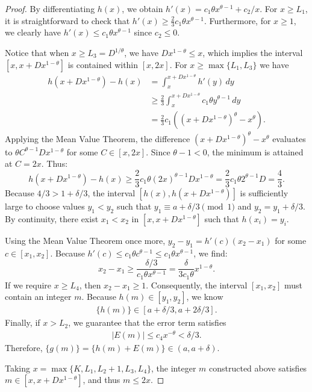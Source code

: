 \documentclass[12pt]{amsart}
\numberwithin{equation}{section}
\begin{document}
\begin{proof}
By differentiating $h(x)$, we obtain $h'(x) = c_{1}\theta x^{\theta-1} + c_{2}/x$. For $x \geq L_{1}$, it is straightforward to check that $h'(x) \geq \frac{2}{3}c_{1}\theta x^{\theta-1}$. Furthermore, for $x \geq 1$, we clearly have $h'(x) \leq c_{1}\theta x^{\theta-1}$ since $c_2 \leq 0$. 

Notice that when $x \geq L_{3} = D^{1/\theta}$, we have $Dx^{1-\theta} \leq x$, which implies the interval $[x, x+Dx^{1-\theta}]$ is contained within $[x, 2x]$. For $x \geq \max\{L_1, L_3\}$ we have
\begin{align*}
h(x+Dx^{1-\theta}) - h(x) &= \int_{x}^{x+Dx^{1-\theta}} h'(y) \, dy \\
&\geq \frac{2}{3} \int_x^{x+Dx^{1-\theta}} c_1 \theta y^{\theta-1} \, dy \\
&= \frac{2}{3} c_1 \left( (x+Dx^{1-\theta})^\theta - x^\theta \right).
\end{align*}
Applying the Mean Value Theorem, the difference $(x+Dx^{1-\theta})^\theta - x^\theta$ evaluates to $\theta C^{\theta-1} Dx^{1-\theta}$ for some $C \in [x, 2x]$. Since $\theta - 1 < 0$, the minimum is attained at $C = 2x$. Thus:
\begin{equation*}
h(x+Dx^{1-\theta}) - h(x) \geq \frac{2}{3} c_1 \theta (2x)^{\theta-1} D x^{1-\theta} = \frac{2}{3} c_1 \theta 2^{\theta-1} D = \frac{4}{3}.
\end{equation*}
Because $4/3 > 1 + \delta/3$, the interval $[h(x), h(x+Dx^{1-\theta})]$ is sufficiently large to choose values $y_{1} < y_{2}$ such that $y_1 \equiv a + \delta/3 \pmod 1$ and $y_{2} = y_{1} + \delta/3$. By continuity, there exist $x_1 < x_2$ in $[x, x+Dx^{1-\theta}]$ such that $h(x_i) = y_i$. 

Using the Mean Value Theorem once more, $y_2 - y_1 = h'(c)(x_2 - x_1)$ for some $c \in [x_1, x_2]$. Because $h'(c) \leq c_1 \theta c^{\theta-1} \leq c_1 \theta x^{\theta-1}$, we find:
\begin{equation*}
x_{2}-x_{1} \geq \frac{\delta/3}{c_1 \theta x^{\theta-1}} = \frac{\delta}{3 c_{1}\theta}x^{1-\theta}.
\end{equation*}
If we require $x \geq L_{4}$, then $x_{2}-x_{1} \geq 1$. Consequently, the interval $[x_{1},x_{2}]$ must contain an integer $m$. Because $h(m) \in [y_1, y_2]$, we know
\begin{align*}
\{h(m)\} \in [a+\delta/3, a+2\delta/3].
\end{align*}
Finally, if $x > L_2$, we guarantee that the error term satisfies 
\begin{align*}
|E(m)| \leq c_4 x^{-\theta} < \delta/3.
\end{align*}
Therefore, $\{g(m)\} = \{h(m) + E(m)\} \in (a, a+\delta)$.

Taking $x = \max\{K, L_1, L_2+1, L_3, L_4\}$, the integer $m$ constructed above satisfies $m \in [x,x+Dx^{1-\theta}]$, and thus $m \leq 2x$.
\end{proof}
\end{document}

